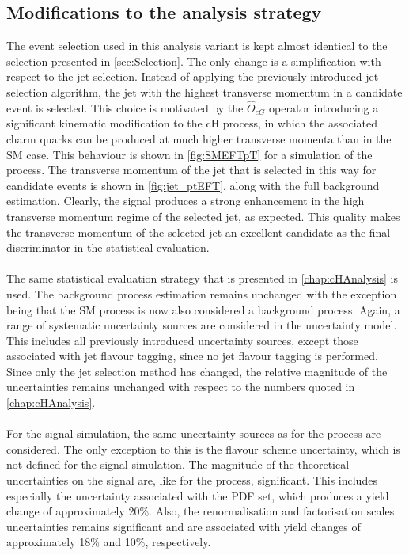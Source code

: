 \subsection{Modifications to the analysis strategy}
The event selection used in this analysis variant is kept almost identical to the selection presented in \autoref{sec:Selection}. The only change is a simplification with respect to the jet selection. Instead of applying the previously introduced jet selection algorithm, the jet with the highest transverse momentum in a candidate event is selected. This choice is motivated by the $\hat{O}_{cG}$ operator introducing a significant kinematic modification to the cH process, in which the associated charm quarks can be produced at much higher transverse momenta than in the SM case. This behaviour is shown in \autoref{fig:SMEFTpT} for a simulation of the \cHZZCMD process. The transverse momentum of the jet that is selected in this way for \cHZZCMD candidate events is shown in \autoref{fig:jet_ptEFT}, along with the full background estimation. Clearly, the \cHZZCMD signal produces a strong enhancement in the high transverse momentum regime of the selected jet, as expected. This quality makes the transverse momentum of the selected jet an excellent candidate as the final discriminator in the statistical evaluation.  \\
\\
The same statistical evaluation strategy that is presented in \autoref{chap:cHAnalysis} is used. The background process estimation remains unchanged with the exception being that the SM \cHZZ process is now also considered a background process. Again, a range of systematic uncertainty sources are considered in the uncertainty model. This includes all previously introduced uncertainty sources, except those associated with jet flavour tagging, since no jet flavour tagging is performed. Since only the jet selection method has changed, the relative magnitude of the uncertainties remains unchanged with respect to the numbers quoted in \autoref{chap:cHAnalysis}.\\
\\ 
For the \cHZZCMD signal simulation, the same uncertainty sources as for the \cHZZ process are considered. The only exception to this is the flavour scheme uncertainty, which is not defined for the \cHZZCMD signal simulation. The magnitude of the theoretical uncertainties on the \cHZZCMD signal are, like for the \cHZZ process, significant. This includes especially the uncertainty associated with the PDF set, which produces a yield change of approximately 20\%. Also, the renormalisation and factorisation scales uncertainties remains significant and are associated with yield changes of approximately 18\% and 10\%, respectively.
